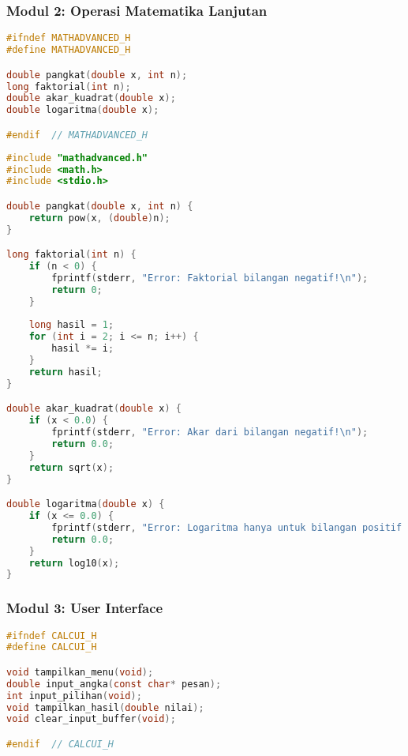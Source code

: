 \documentclass[../main.tex]{subfiles}
\begin{document}
\subsubsection{Modul 2: Operasi Matematika Lanjutan}
\begin{lstlisting}[language=C, caption={mathadvanced.h - header operasi lanjutan}]
#ifndef MATHADVANCED_H
#define MATHADVANCED_H

double pangkat(double x, int n);
long faktorial(int n);
double akar_kuadrat(double x);
double logaritma(double x);

#endif  // MATHADVANCED_H
\end{lstlisting}

\begin{lstlisting}[language=C, caption={mathadvanced.c - implementasi operasi lanjutan}]
#include "mathadvanced.h"
#include <math.h>
#include <stdio.h>

double pangkat(double x, int n) {
    return pow(x, (double)n);
}

long faktorial(int n) {
    if (n < 0) {
        fprintf(stderr, "Error: Faktorial bilangan negatif!\n");
        return 0;
    }
    
    long hasil = 1;
    for (int i = 2; i <= n; i++) {
        hasil *= i;
    }
    return hasil;
}

double akar_kuadrat(double x) {
    if (x < 0.0) {
        fprintf(stderr, "Error: Akar dari bilangan negatif!\n");
        return 0.0;
    }
    return sqrt(x);
}

double logaritma(double x) {
    if (x <= 0.0) {
        fprintf(stderr, "Error: Logaritma hanya untuk bilangan positif!\n");
        return 0.0;
    }
    return log10(x);
}
\end{lstlisting}

\subsubsection{Modul 3: User Interface}
\begin{lstlisting}[language=C, caption={calcui.h - header antarmuka pengguna}]
#ifndef CALCUI_H
#define CALCUI_H

void tampilkan_menu(void);
double input_angka(const char* pesan);
int input_pilihan(void);
void tampilkan_hasil(double nilai);
void clear_input_buffer(void);

#endif  // CALCUI_H
\end{lstlisting}
\end{document}
